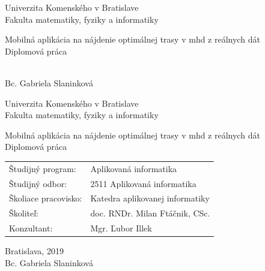 \documentclass[12pt, oneside]{book}
\def\mfrok{2019}
\def\mfnazov{Mobilná aplikácia na nájdenie optimálnej trasy v mhd z reálnych dát}
\def\mftyp{Diplomová práca}
\def\mfautor{Bc. Gabriela Slaninková}
\def\mfskolitel{doc. RNDr. Milan Ftáčnik, CSc.}
\def\mfkonzultant{Mgr. Ľubor Illek }
\def\mfmiesto{Bratislava, \mfrok}
\def\mfodbor{2511 Aplikovaná informatika}
\def\program{ Aplikovaná informatika }
\def\mfpracovisko{ Katedra aplikovanej informatiky }
\begin{document}
     
\frontmatter


\thispagestyle{empty}

\begin{center}
\sc\large
Univerzita Komenského v Bratislave\\
Fakulta matematiky, fyziky a informatiky

\vfill

{\LARGE\mfnazov}\\
\mftyp
\end{center}

\vfill

{\sc\large 
\noindent \mfrok\\
\mfautor
}

\eject %


\thispagestyle{empty}
\noindent

\begin{center}
\sc  
\large
Univerzita Komenského v Bratislave\\
Fakulta matematiky, fyziky a informatiky

\vfill

{\LARGE\mfnazov}\\
\mftyp
\end{center}

\vfill

\noindent
\begin{tabular}{ll}
Študijný program: & \program \\
Študijný odbor: & \mfodbor \\
Školiace pracovisko: & \mfpracovisko \\
Školiteľ: & \mfskolitel \\
Konzultant: & \mfkonzultant \\
\end{tabular}

\vfill


\noindent \mfmiesto\\
\mfautor

\eject %




\end{document}
